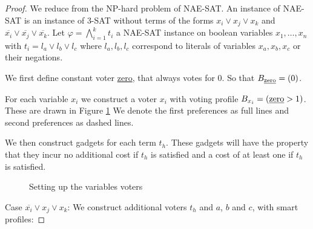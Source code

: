 \documentclass[11pt,a4paper, titlepage]{article}
\theoremstyle{definition}
\begin{document}
\begin{proof}
    We reduce from the NP-hard problem of \textsc{NAE-SAT}. An instance of \textsc{NAE-SAT} is an instance of \textsc{3-SAT} without terms of the forms $x_i \lor x_j \lor x_k$ and $\overline{x_i} \lor \overline{x_j} \lor \overline{x_k}$. 
    Let $\varphi = \bigwedge_{i = 1}^k t_i $ a \textsc{NAE-SAT} instance on boolean variables $x_1, \ldots, x_n$ with $t_i = l_a \lor l_b \lor l_c $ where $l_a, l_b, l_c$ correspond to literals of variables $x_a, x_b, x_c$ or their negations.
    
    We first define constant voter \underline{zero}, that always votes for 0. So that $B_{\text{\underline{zero}}} = (0)$.



For each variable $x_i$ we construct a voter $x_i$ with voting profile $B_{x_i} = (  \text{\underline{zero}} > 1) $. These are drawn in Figure \ref{fig:votes} We denote the first preferences as full lines and second preferences as dashed lines.


We then construct gadgets for each term $t_h$. These gadgets will have the property that they incur no additional cost if $t_h$ is satisfied and a cost of at least one if $t_h$ is satisfied.
\begin{figure}
    \centering
    \qquad
    \caption{Setting up the variables voters}
    \label{fig:votes}
\end{figure}

Case $\overline{x_i} \lor x_j \lor x_k$: We construct additional voters $t_h$ and $a$, $b$ and $c$, with smart profiles:


\end{proof}
\end{document}
